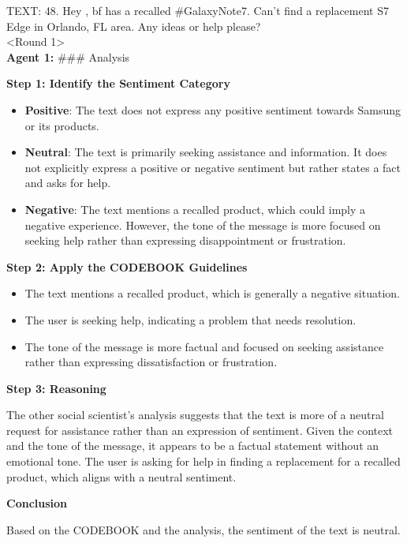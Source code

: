 TEXT: 48. Hey \@SamsungMobileUS, bf has a recalled \#GalaxyNote7. Can't find a replacement S7 Edge in Orlando, FL area. Any ideas or help please?\\

<Round 1>\\

\textbf{Agent 1:} \#\#\# Analysis

\textbf{Step 1: Identify the Sentiment Category}

\begin{itemize}
\tightlist
\item
  \textbf{Positive}: The text does not express any positive sentiment
  towards Samsung or its products.
\item
  \textbf{Neutral}: The text is primarily seeking assistance and
  information. It does not explicitly express a positive or negative
  sentiment but rather states a fact and asks for help.
\item
  \textbf{Negative}: The text mentions a recalled product, which could
  imply a negative experience. However, the tone of the message is more
  focused on seeking help rather than expressing disappointment or
  frustration.
\end{itemize}

\textbf{Step 2: Apply the CODEBOOK Guidelines}

\begin{itemize}
\tightlist
\item
  The text mentions a recalled product, which is generally a negative
  situation.
\item
  The user is seeking help, indicating a problem that needs resolution.
\item
  The tone of the message is more factual and focused on seeking
  assistance rather than expressing dissatisfaction or frustration.
\end{itemize}

\textbf{Step 3: Reasoning}

The other social scientist's analysis suggests that the text is more of
a neutral request for assistance rather than an expression of sentiment.
Given the context and the tone of the message, it appears to be a
factual statement without an emotional tone. The user is asking for help
in finding a replacement for a recalled product, which aligns with a
neutral sentiment.

\textbf{Conclusion}

Based on the CODEBOOK and the analysis, the sentiment of the text is
neutral.

